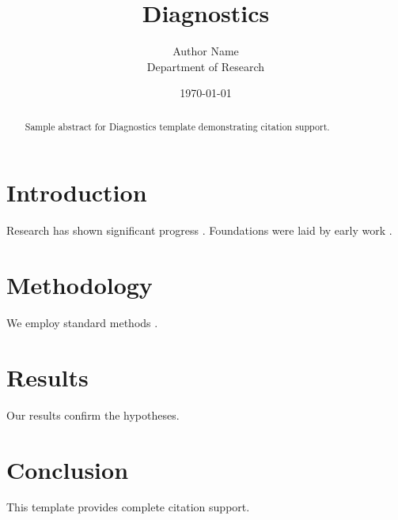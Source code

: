 \documentclass{mdpi}
\title{Diagnostics}
\author{Author Name \\ \small Department of Research}
\date{\today}
\begin{document}
\maketitle

\begin{abstract}
Sample abstract for Diagnostics template demonstrating citation support.
\end{abstract}

\section{Introduction}
Research has shown significant progress \citep{einstein1905}. Foundations were laid by early work \citep{turing1950}.

\section{Methodology}
We employ standard methods \citep{knuth1984}.

\section{Results}
Our results confirm the hypotheses.

\section{Conclusion}
This template provides complete citation support.



\end{document}
